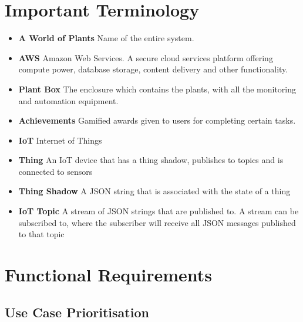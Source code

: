 \documentclass{article}
\begin{document}
\section{Important Terminology}
\begin{itemize}
	\item \textbf{A World of Plants} Name of the entire system.
	\item \textbf{AWS} Amazon Web Services. A secure cloud services platform offering compute power, database storage, content delivery and other functionality.
	\item \textbf{Plant Box} The enclosure which contains the plants, with all the monitoring and automation equipment.
	\item \textbf{Achievements} Gamified awards given to users for completing certain tasks.
	\item \textbf{IoT} Internet of Things
	\item \textbf{Thing} An IoT device that has a thing shadow, publishes to topics and is connected to sensors
	\item \textbf{Thing Shadow} A JSON string that is associated with the state of a thing
	\item \textbf{IoT Topic} A stream of JSON strings that are published to. A stream can be subscribed to, where the subscriber will receive all JSON messages published to that topic
\end{itemize}

\section{Functional Requirements}
\subsection{Use Case Prioritisation}
\end{document}
